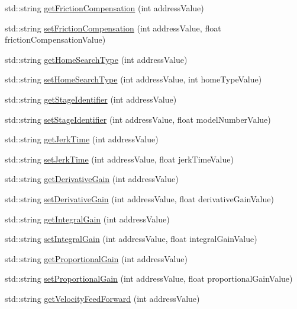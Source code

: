 \begin{DoxyCompactItemize}
\item 
std\+::string \hyperlink{namespaceconex_afaa116b8274daffbd23139bb930596f9}{get\+Friction\+Compensation} (int address\+Value)
\item 
std\+::string \hyperlink{namespaceconex_a45b737635000384b926ab6e2bd829865}{set\+Friction\+Compensation} (int address\+Value, float friction\+Compensation\+Value)
\item 
std\+::string \hyperlink{namespaceconex_ad1b0c2c8ee173f299589772d4c2fd3b2}{get\+Home\+Search\+Type} (int address\+Value)
\item 
std\+::string \hyperlink{namespaceconex_a2b7cd3e7462a4a8f2ba9e48ea5b5c450}{set\+Home\+Search\+Type} (int address\+Value, int home\+Type\+Value)
\item 
std\+::string \hyperlink{namespaceconex_ad9475bdc92877f316a2e3db9ff0e8fb1}{get\+Stage\+Identifier} (int address\+Value)
\item 
std\+::string \hyperlink{namespaceconex_a81886be7ef4e25e26a4a222d4716ea7f}{set\+Stage\+Identifier} (int address\+Value, float model\+Number\+Value)
\item 
std\+::string \hyperlink{namespaceconex_acef19de1c3d630503736cf1bf20d4dbc}{get\+Jerk\+Time} (int address\+Value)
\item 
std\+::string \hyperlink{namespaceconex_aa3f88891fb93e706d4be157b584a7f42}{set\+Jerk\+Time} (int address\+Value, float jerk\+Time\+Value)
\item 
std\+::string \hyperlink{namespaceconex_a30cba542f0ebd8eea74032431fb29d21}{get\+Derivative\+Gain} (int address\+Value)
\item 
std\+::string \hyperlink{namespaceconex_aa25149260c978531ca8f139da8b968b8}{set\+Derivative\+Gain} (int address\+Value, float derivative\+Gain\+Value)
\item 
std\+::string \hyperlink{namespaceconex_ad08578dd23c3b65f2d73405ca35774ad}{get\+Integral\+Gain} (int address\+Value)
\item 
std\+::string \hyperlink{namespaceconex_af806b975f4f1ce8ee3e83ce660f72593}{set\+Integral\+Gain} (int address\+Value, float integral\+Gain\+Value)
\item 
std\+::string \hyperlink{namespaceconex_a0ed457be041ec821472eb60ef3f7768d}{get\+Proportional\+Gain} (int address\+Value)
\item 
std\+::string \hyperlink{namespaceconex_a852e0fb570af45c7d523f94a2b81b84b}{set\+Proportional\+Gain} (int address\+Value, float proportional\+Gain\+Value)
\item 
std\+::string \hyperlink{namespaceconex_aee916cc8cb9915577fc989826496fe6e}{get\+Velocity\+Feed\+Forward} (int address\+Value)

\end{DoxyCompactItemize}
